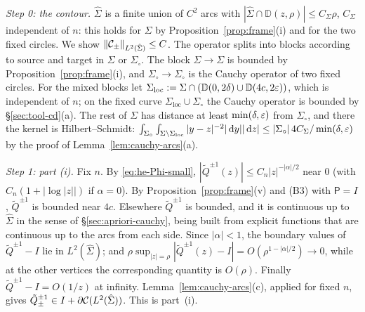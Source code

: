 \emph{Step 0: the contour.} $\hat\Sigma$ is a finite union of $C^2$ arcs with $|\hat\Sigma\cap \mathbb D(z,\rho)|\le C_\Sigma\rho$, $C_\Sigma$ independent
of $n$: this holds for $\Sigma$ by Proposition~\ref{prop:frame}(i) and for the two fixed circles. We show $\|\mathcal{C}_\pm\|_{L^2(\hat\Sigma)}\le C$. The
operator splits into blocks according to source and target in $\Sigma$ or $\Sigma_{\circ}$. The block $\Sigma\to\Sigma$ is
bounded by Proposition~\ref{prop:frame}(i), and $\Sigma_{\circ}\to\Sigma_{\circ}$ is the Cauchy operator of two fixed circles. For the mixed blocks let
$\Sigma_{\mathrm{loc}}:=\Sigma\cap(\mathbb D(0,2\delta)\cup \mathbb D(4c,2\varepsilon))$, which is independent of $n$; on the fixed curve
$\Sigma_{\mathrm{loc}}\cup\Sigma_{\circ}$ the Cauchy operator is bounded by \S\ref{sec:tool-cd}(a). The rest of $\Sigma$ has distance at
least $\min(\delta,\varepsilon)$ from $\Sigma_{\circ}$, and there the kernel is Hilbert--Schmidt:
$\int_{\Sigma_{\circ}}\int_{\Sigma\setminus\Sigma_{\mathrm{loc}}}|y-z|^{-2}|\,\mathrm{d} y||\,\mathrm{d} z|\le|\Sigma_{\circ}|\,4C_\Sigma/\min(\delta,\varepsilon)$ by the proof
of Lemma~\ref{lem:cauchy-arcs}(a).

\emph{Step 1: part (i).} Fix $n$. By \eqref{eq:he-Phi-small}, $|\tilde Q^{\pm1}(z)|\le C_n|z|^{-|\alpha|/2}$ near $0$
(with $C_n(1+|\log|z||)$ if $\alpha=0$). By Proposition~\ref{prop:frame}(v) and (B3) with $\mathsf P=I$, $\tilde Q^{\pm1}$ is
bounded near $4c$. Elsewhere $\tilde Q^{\pm1}$ is bounded, and it is continuous up to $\hat\Sigma$ in the sense of
\S\ref{sec:apriori-cauchy}, being built from explicit functions that are continuous up to the arcs from each side. Since
$|\alpha|<1$, the boundary values of $\tilde Q^{\pm1}-I$ lie in $L^2(\hat\Sigma)$; and
$\rho\sup_{|z|=\rho}|\tilde Q^{\pm1}(z)-I|=O(\rho^{1-|\alpha|/2})\to0$, while at the other vertices the corresponding
quantity is $O(\rho)$. Finally $\tilde Q^{\pm1}-I=O(1/z)$ at infinity. Lemma~\ref{lem:cauchy-arcs}(c), applied for fixed $n$,
gives $\tilde Q_\pm^{\pm1}\in I+\partial\mathcal{C}(L^2(\hat\Sigma))$. This is part~(i).

